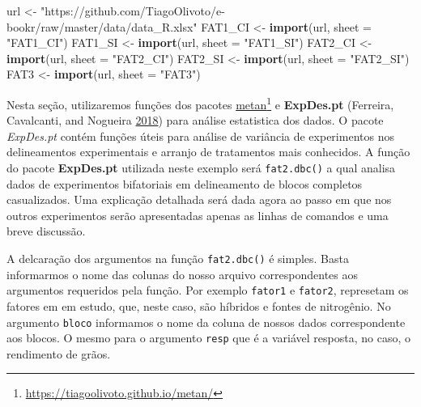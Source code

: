 \documentclass[
]{book}
\makeatletter
\newenvironment{Shaded}{\begin{snugshade}}{\end{snugshade}}
\newcommand{\DataTypeTok}[1]{\textcolor[rgb]{0.13,0.29,0.53}{#1}}
\newcommand{\KeywordTok}[1]{\textcolor[rgb]{0.13,0.29,0.53}{\textbf{#1}}}
\newcommand{\NormalTok}[1]{#1}
\newcommand{\StringTok}[1]{\textcolor[rgb]{0.31,0.60,0.02}{#1}}
\numberwithin{equation}{section}
\newcommand{\indf}[1]{\index[function]{#1@\texttt{#1()}|ST}}
\newcommand{\indt}[1]{\index{#1|ST}}
\makeatother
\begin{document}
\begin{Shaded}
\begin{Highlighting}[]
\NormalTok{url \textless{}{-}}\StringTok{ "https://github.com/TiagoOlivoto/e{-}bookr/raw/master/data/data\_R.xlsx"}
\NormalTok{FAT1\_CI \textless{}{-}}\StringTok{ }\KeywordTok{import}\NormalTok{(url, }\DataTypeTok{sheet =} \StringTok{"FAT1\_CI"}\NormalTok{)}
\NormalTok{FAT1\_SI \textless{}{-}}\StringTok{ }\KeywordTok{import}\NormalTok{(url, }\DataTypeTok{sheet =} \StringTok{"FAT1\_SI"}\NormalTok{)}
\NormalTok{FAT2\_CI \textless{}{-}}\StringTok{ }\KeywordTok{import}\NormalTok{(url, }\DataTypeTok{sheet =} \StringTok{"FAT2\_CI"}\NormalTok{)}
\NormalTok{FAT2\_SI \textless{}{-}}\StringTok{ }\KeywordTok{import}\NormalTok{(url, }\DataTypeTok{sheet =} \StringTok{"FAT2\_SI"}\NormalTok{)}
\NormalTok{FAT3 \textless{}{-}}\StringTok{ }\KeywordTok{import}\NormalTok{(url, }\DataTypeTok{sheet =} \StringTok{"FAT3"}\NormalTok{)}
\end{Highlighting}
\end{Shaded}

Nesta seção, utilizaremos funções dos pacotes \href{https://tiagoolivoto.github.io/metan/}{metan}\footnote{\url{https://tiagoolivoto.github.io/metan/}} e \textbf{ExpDes.pt} \indt{ExpDes} (Ferreira, Cavalcanti, and Nogueira \protect\hyperlink{ref-Ferreira2018}{2018}) para análise estatistica dos dados. O pacote \emph{ExpDes.pt} contém funções úteis para análise de variância de experimentos nos delineamentos experimentais e arranjo de tratamentos mais conhecidos. A função do pacote \textbf{ExpDes.pt} utilizada neste exemplo será \texttt{fat2.dbc()} \indf{fat2.dbc} a qual analisa dados de experimentos bifatoriais em delineamento de blocos completos casualizados. Uma explicação detalhada será dada agora ao passo em que nos outros experimentos serão apresentadas apenas as linhas de comandos e uma breve discussão.

A delcaração dos argumentos na função \texttt{fat2.dbc()} é simples. Basta informarmos o nome das colunas do nosso arquivo correspondentes aos argumentos requeridos pela função. Por exemplo \texttt{fator1} e \texttt{fator2}, represetam os fatores em em estudo, que, neste caso, são híbridos e fontes de nitrogênio. No argumento \texttt{bloco} informamos o nome da coluna de nossos dados correspondente aos blocos. O mesmo para o argumento \texttt{resp} que é a variável resposta, no caso, o rendimento de grãos.
\end{document}
